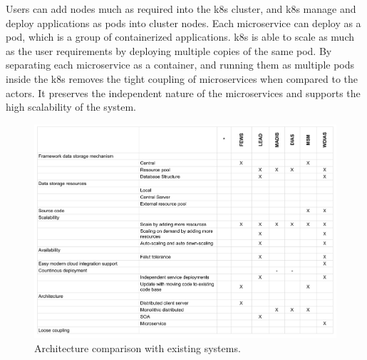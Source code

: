Users can add nodes much as required into the \acrshort{k8s} cluster, and \acrshort{k8s} manage and deploy applications as pods into cluster nodes. Each microservice can deploy as a pod, which is a group of containerized applications. \acrshort{k8s} is able to scale as much as the user requirements by deploying multiple copies of the same pod. By separating each microservice as a container, and running them as multiple pods inside the \acrshort{k8s} removes the tight coupling of microservices when compared to the actors. It preserves the independent nature of the microservices and supports the high scalability of the system.


\begin{figure}[htp]
    \centering
    \includegraphics[width=1\textwidth]{method/misc/architecture_comparison_pros_cons.pdf}
    \caption{Architecture comparison with existing systems.}
    \label{fi:architecture_comparison}
\end{figure}

